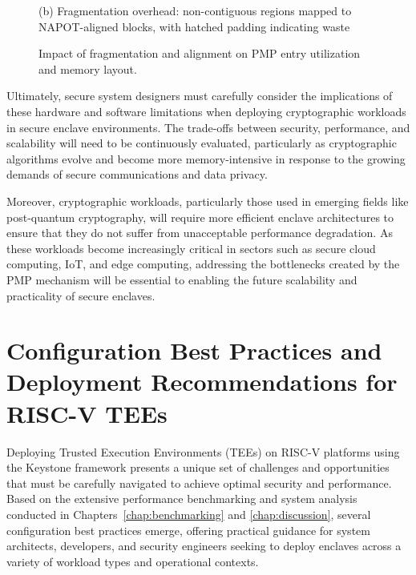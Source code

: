 \begin{figure}[htbp]
\begin{minipage}{0.9\textwidth}
\caption*{(b) Fragmentation overhead: non-contiguous regions mapped to NAPOT-aligned blocks, with hatched padding indicating waste}
\label{fig:napot-fragmentation}
\end{minipage}

\caption{Impact of fragmentation and alignment on PMP entry utilization and memory layout.}
\label{fig:pmp-fragmentation-group}
\end{figure}


Ultimately, secure system designers must carefully consider the implications of these hardware and software limitations when deploying cryptographic workloads in secure enclave environments. The trade-offs between security, performance, and scalability will need to be continuously evaluated, particularly as cryptographic algorithms evolve and become more memory-intensive in response to the growing demands of secure communications and data privacy.

Moreover, cryptographic workloads, particularly those used in emerging fields like post-quantum cryptography, will require more efficient enclave architectures to ensure that they do not suffer from unacceptable performance degradation. As these workloads become increasingly critical in sectors such as secure cloud computing, IoT, and edge computing, addressing the bottlenecks created by the PMP mechanism will be essential to enabling the future scalability and practicality of secure enclaves.

\section{Configuration Best Practices and Deployment Recommendations for RISC-V TEEs}

Deploying Trusted Execution Environments (TEEs) on RISC-V platforms using the Keystone framework presents a unique set of challenges and opportunities that must be carefully navigated to achieve optimal security and performance. Based on the extensive performance benchmarking and system analysis conducted in Chapters~\ref{chap:benchmarking} and \ref{chap:discussion}, several configuration best practices emerge, offering practical guidance for system architects, developers, and security engineers seeking to deploy enclaves across a variety of workload types and operational contexts.

